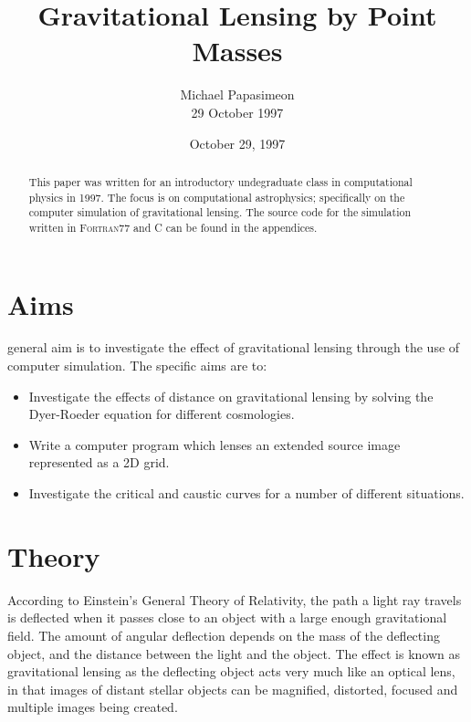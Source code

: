 \documentclass[a4paper]{IEEEtran}
\title{Gravitational Lensing by Point Masses}
\author{Michael Papasimeon\\29 October 1997}
\date{October 29, 1997}
\begin{document}
\maketitle

\begin{abstract} 
This paper was written for an introductory undegraduate class in computational physics in 1997. 
The focus is on computational astrophysics; specifically on the computer simulation of gravitational
lensing. The source code for the simulation written in \textsc{Fortran77} and \textsc{C} can be found 
in the appendices. 
\end{abstract} 

\section{Aims}
general aim is to investigate the effect of gravitational lensing through the 
use of computer simulation. The specific aims are to:
\begin{itemize}
    \item Investigate the effects of distance on gravitational lensing
          by solving the Dyer-Roeder equation for different cosmologies.
    \item Write a computer program which lenses an extended source image 
          represented as a 2D grid. 
    \item Investigate the critical and caustic curves for a number of different
          situations.
\end{itemize}

\section{Theory}
According to Einstein's General Theory of Relativity, the path a light
ray travels is deflected when it passes close to an object with a large
enough gravitational field. The amount of angular deflection depends on
the mass of the deflecting object, and the distance between the light and
the object. The effect is known as gravitational lensing as the deflecting
object acts very much like an optical lens, in that images of distant
stellar objects can be magnified, distorted, focused and multiple
images being created.
\end{document}
